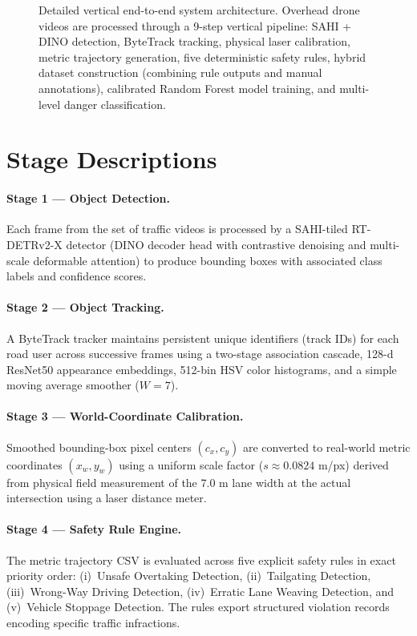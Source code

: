 \documentclass[12pt,a4paper]{report}
\begin{document}
\begin{figure}[p]
\begin{tikzpicture}
\end{tikzpicture}
\caption{Detailed vertical end-to-end system architecture. Overhead drone videos are processed through a 9-step vertical pipeline: SAHI + DINO detection, ByteTrack tracking, physical laser calibration, metric trajectory generation, five deterministic safety rules, hybrid dataset construction (combining rule outputs and manual annotations), calibrated Random Forest model training, and multi-level danger classification.}
\label{fig:system_arch}
\end{figure}
\clearpage

\section{Stage Descriptions}

\paragraph{Stage 1 — Object Detection.}
Each frame from the set of traffic videos is processed by a SAHI-tiled RT-DETRv2-X detector (DINO decoder head with contrastive denoising and multi-scale deformable attention) to produce bounding boxes with associated class labels and confidence scores.

\paragraph{Stage 2 — Object Tracking.}
A ByteTrack tracker maintains persistent unique identifiers (track IDs) for each road user across successive frames using a two-stage association cascade, 128-d ResNet50 appearance embeddings, 512-bin HSV color histograms, and a simple moving average smoother ($W = 7$).

\paragraph{Stage 3 — World-Coordinate Calibration.}
Smoothed bounding-box pixel centers $(c_x, c_y)$ are converted to real-world metric coordinates $(x_w, y_w)$ using a uniform scale factor ($s \approx 0.0824$ m/px) derived from physical field measurement of the 7.0 m lane width at the actual intersection using a laser distance meter.

\paragraph{Stage 4 — Safety Rule Engine.}
The metric trajectory CSV is evaluated across five explicit safety rules in exact priority order: (i)~Unsafe Overtaking Detection, (ii)~Tailgating Detection, (iii)~Wrong-Way Driving Detection, (iv)~Erratic Lane Weaving Detection, and (v)~Vehicle Stoppage Detection. The rules export structured violation records encoding specific traffic infractions.
\end{document}

